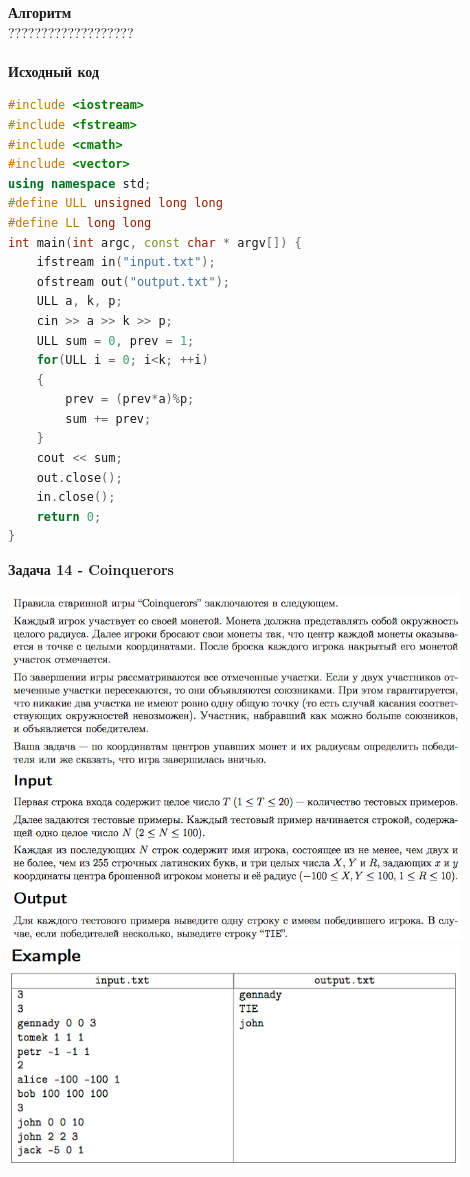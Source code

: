 \documentclass[a4paper,12pt]{article}
\begin{document}
\textbf{{\large Алгоритм}} \\
{\Huge ???????????????????} \\ 
\\
\textbf{{\large Исходный код}}
\begin{lstlisting}[language=C++]
#include <iostream>
#include <fstream>
#include <cmath>
#include <vector>
using namespace std;
#define ULL unsigned long long
#define LL long long
int main(int argc, const char * argv[]) {
    ifstream in("input.txt");
    ofstream out("output.txt");
    ULL a, k, p;
    cin >> a >> k >> p;
    ULL sum = 0, prev = 1;
    for(ULL i = 0; i<k; ++i)
    {
        prev = (prev*a)%p;
        sum += prev;
    }
    cout << sum;
    out.close();
    in.close();
    return 0;
}
\end{lstlisting}

\textbf{{\large Задача 14 - Coinquerors}} \\
\begin{center}
\includegraphics[width=0.9\textwidth]{OC_Siberia/OC_Siberia_14_1.png}\\ [1cm]
\includegraphics[width=0.9\textwidth]{OC_Siberia/OC_Siberia_14_2.png}\\ [1cm]

\end{center}
\newpage
\end{document}
